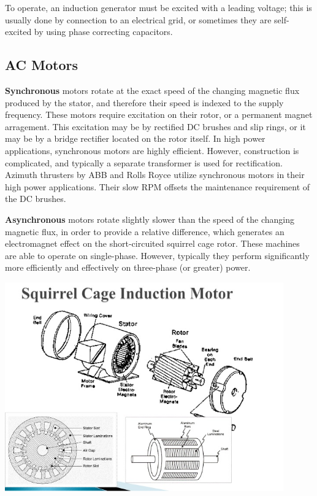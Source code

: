 \documentclass[11pt,a4paper]{article}
\begin{document}
To operate, an induction generator must be excited with a leading voltage; this is usually done by connection to an electrical grid, or sometimes they are self-excited by using phase correcting capacitors.
\subsection{AC Motors}
\textbf{Synchronous} motors rotate at the exact speed of the changing magnetic flux produced by the stator, and therefore their speed is indexed to the supply frequency. These motors require excitation on their rotor, or a permanent magnet arragement. This excitation may be by rectified DC brushes and slip rings, or it may be by a bridge rectifier located on the rotor itself. In high power applications, synchronous motors are highly efficient. However, construction is complicated, and typically a separate transformer is used for rectification. Azimuth thrusters by ABB and Rolls Royce utilize synchronous motors in their high power applications. Their slow RPM offsets the maintenance requirement of the DC brushes.

\textbf{Asynchronous} motors rotate slightly slower than the speed of the changing magnetic flux, in order to provide a relative difference, which generates an electromagnet effect on the short-circuited squirrel cage rotor. These machines are able to operate on single-phase. However, typically they perform significantly more efficiently and effectively on three-phase (or greater) power.

\begin{center}
\includegraphics[width=12cm]{asyncmotor.jpg}
\end{center}
\end{document}
